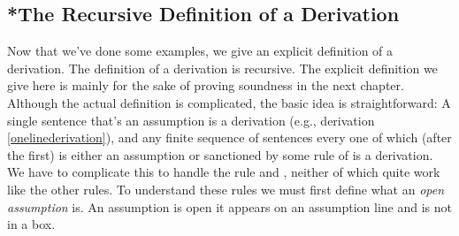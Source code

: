 \subsection{*The Recursive Definition of a Derivation}\label{RecDefOfDerv}
Now that we've done some examples, we give an explicit definition of a derivation. 
The definition of a derivation is recursive. 
The explicit definition we give here is mainly for the sake of proving soundness in the next chapter. 
Although the actual definition is complicated, the basic idea is straightforward: 
A single \GSL{} sentence that's an assumption is a derivation (e.g., derivation \ref{onelinederivation}), and any finite sequence of \GSL{} sentences every one of which (after the first) is either an assumption or sanctioned by some rule of \GSD{} is a derivation. 
We have to complicate this to handle the rule  and , neither of which quite work like the other rules.
To understand these rules we must first define what an \emph{open assumption} is. An assumption is open \Iff it appears on an assumption line and is not in a box.
